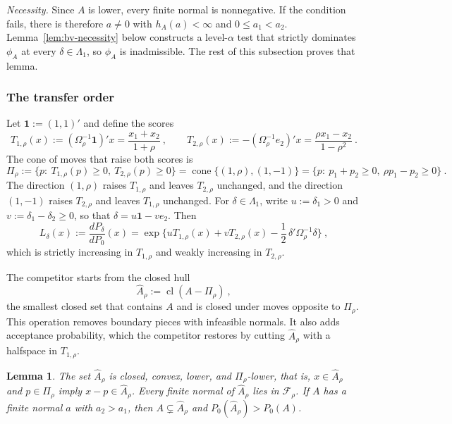 \documentclass[11pt]{article}
\numberwithin{equation}{section}
\newtheorem{lemma}{Lemma}
\theoremstyle{definition}
\begin{document}
\emph{Necessity.} Since $A$ is lower, every finite normal is nonnegative. If the condition fails, there is therefore $a\ne0$ with $h_A(a)<\infty$ and $0\le a_1<a_2$. Lemma~\ref{lem:bv-necessity} below constructs a level-$\alpha$ test that strictly dominates $\phi_A$ at every $\delta\in\Lambda_1$, so $\phi_A$ is inadmissible. The rest of this subsection proves that lemma.

\subsubsection*{The transfer order}

Let $\mathbf 1:=(1,1)'$ and define the scores
\[
T_{1,\rho}(x):=(\Omega_\rho^{-1}\mathbf 1)'x=\frac{x_1+x_2}{1+\rho}~,
\qquad
T_{2,\rho}(x):=-(\Omega_\rho^{-1}e_2)'x=\frac{\rho x_1-x_2}{1-\rho^2}~.
\]
The cone of moves that raise both scores is
\begin{equation}\label{eq:bv-transfer-cone}
\Pi_\rho:=\{p:\ T_{1,\rho}(p)\ge0,\ T_{2,\rho}(p)\ge0\}
=\operatorname{cone}\{(1,\rho),(1,-1)\}
=\{p:\ p_1+p_2\ge0,\ \rho p_1-p_2\ge0\}~.
\end{equation}
The direction $(1,\rho)$ raises $T_{1,\rho}$ and leaves $T_{2,\rho}$ unchanged, and the direction $(1,-1)$ raises $T_{2,\rho}$ and leaves $T_{1,\rho}$ unchanged. For $\delta\in\Lambda_1$, write $u:=\delta_1>0$ and $v:=\delta_1-\delta_2\ge0$, so that $\delta=u\mathbf 1-ve_2$. Then
\begin{equation}\label{eq:bv-LR}
L_\delta(x):=\frac{dP_\delta}{dP_0}(x)=\exp\Big\{uT_{1,\rho}(x)+vT_{2,\rho}(x)-\frac12\,\delta'\Omega_\rho^{-1}\delta\Big\}~,
\end{equation}
which is strictly increasing in $T_{1,\rho}$ and weakly increasing in $T_{2,\rho}$.

The competitor starts from the closed hull
\[
\widehat A_\rho:=\operatorname{cl}(A-\Pi_\rho)~,
\]
the smallest closed set that contains $A$ and is closed under moves opposite to $\Pi_\rho$. This operation removes boundary pieces with infeasible normals. It also adds acceptance probability, which the competitor restores by cutting $\widehat A_\rho$ with a halfspace in $T_{1,\rho}$.

\begin{lemma}\label{lem:bv-hull}
The set $\widehat A_\rho$ is closed, convex, lower, and $\Pi_\rho$-lower, that is, $x\in\widehat A_\rho$ and $p\in\Pi_\rho$ imply $x-p\in\widehat A_\rho$. Every finite normal of $\widehat A_\rho$ lies in $\mathcal F_\rho$. If $A$ has a finite normal $a$ with $a_2>a_1$, then $A\subsetneq\widehat A_\rho$ and $P_0(\widehat A_\rho)>P_0(A)$.
\end{lemma}
\end{document}
